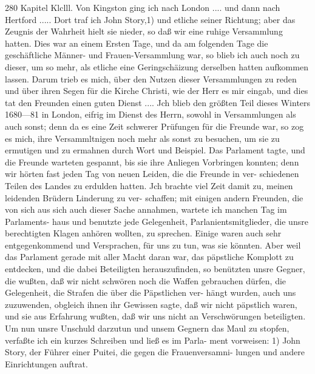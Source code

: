 280 Kapitel Klclll.
Von Kingston ging ich nach London .... und dann nach
Hertford ..... Dort traf ich John Story,1) und etliche seiner
Richtung; aber das Zeugnis der Wahrheit hielt sie nieder, so
daß wir eine ruhige Versammlung hatten. Dies war an einem Ersten
Tage, und da am folgenden Tage die geschäftliche Männer- und
Frauen-Versammlung war, so blieb ich auch noch zu dieser, um
so mehr, als etliche eine Geringschäizung derselben hatten aufkommen
lassen. Darum trieb es mich, über den Nutzen dieser Versammlungen
zu reden und über ihren Segen für die Kirche Christi, wie der
Herr es mir eingab, und dies tat den Freunden einen guten
Dienst ....
Jch blieb den größten Teil dieses Winters 1680—81 in London,
eifrig im Dienst des Herrn, sowohl in Versammlungen als auch
sonst; denn da es eine Zeit schwerer Prüfungen für die Freunde
war, so zog es mich, ihre Versammltnigen noch mehr als sonst
zu besuchen, um sie zu ermutigen und zu ermahnen durch Wort
und Beispiel. Das Parlament tagte, und die Freunde warteten
gespannt, bis sie ihre Anliegen Vorbringen konnten; denn wir
hörten fast jeden Tag von neuen Leiden, die die Freunde in ver-
schiedenen Teilen des Landes zu erdulden hatten. Jch brachte
viel Zeit damit zu, meinen leidenden Brüdern Linderung zu ver-
schaffen; mit einigen andern Freunden, die von sich aus sich auch
dieser Sache annahmen, wartete ich manchen Tag im Parlaments-
haus und benutzte jede Gelegenheit, Parlanientsmitglieder, die
unsre berechtigten Klagen anhören wollten, zu sprechen. Einige
waren auch sehr entgegenkommend und Versprachen, für uns zu
tun, was sie könnten. Aber weil das Parlament gerade mit
aller Macht daran war, das päpstliche Komplott zu entdecken,
und die dabei Beteiligten herauszufinden, so benützten unsre Gegner,
die wußten, daß wir nicht schwören noch die Waffen gebrauchen
dürfen, die Gelegenheit, die Strafen die über die Päpstlichen ver-
hängt wurden, auch uns zuzuwenden, obgleich ihnen ihr Gewissen
sagte, daß wir nicht päpstlich waren, und sie aus Erfahrung
wußten, daß wir uns nicht an Verschwörungen beteiligten. Um
nun unsre Unschuld darzutun und unsem Gegnern das Maul zu
stopfen, verfaßte ich ein kurzes Schreiben und ließ es im Parla-
ment vorweisen:
1) John Story, der Führer einer Puitei, die gegen die Frauenversamni-
lungen und andere Einrichtungen auftrat.


